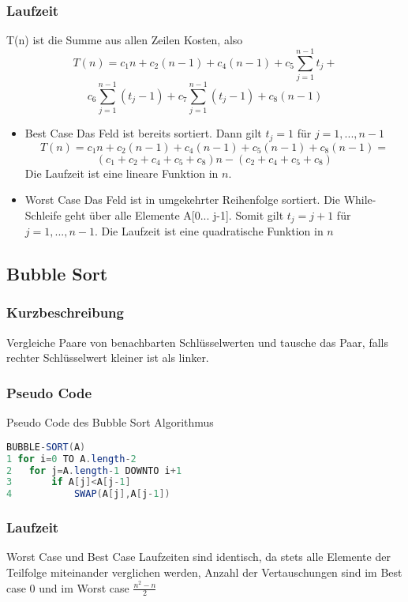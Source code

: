 \documentclass[jou,apacite]{apa6}
\begin{document}
   
\subsubsection{Laufzeit} T(n) ist die Summe aus allen Zeilen Kosten, also 
    \[T(n)=c_{1}n+c_2(n-1)+c_4(n-1)+c_5\sum\limits_{j=1}^{n-1}t_j+\]\[c_6\sum\limits_{j=1}^{n-1}(t_j-1)+c_7\sum\limits_{j=1}^{n-1}(t_j-1)+c_8(n-1)\]
    
    
\begin{itemize}
    \item Best Case Das Feld ist bereits sortiert. Dann gilt $t_j=1$ für $j=1,...,n-1$  \[ T(n) = c_1n + c_2(n-1) + c_4(n-1) + c_5(n-1) + c_8(n-1) =\]\[ (c_1 + c_2 + c_4 + c_5 + c_8) n -(c_2 + c_4 + c_5 + c_8) \] Die Laufzeit ist eine lineare Funktion in $n$.
    \item Worst Case  Das Feld ist in umgekehrter Reihenfolge sortiert. Die While-Schleife geht über alle Elemente A[0... j-1]. Somit gilt $t_j = j+1$ für $j = 1,...,n-1$. Die Laufzeit ist eine quadratische Funktion in $n$
    \end{itemize}
    
\subsection{Bubble Sort}
\subsubsection{Kurzbeschreibung}

Vergleiche Paare von benachbarten Schlüsselwerten und tausche das Paar, falls rechter Schlüsselwert kleiner ist als linker.

\subsubsection{Pseudo Code}
Pseudo Code des Bubble Sort Algorithmus
\begin{lstlisting}[language=Java]
BUBBLE-SORT(A)
1 for i=0 TO A.length-2
2   for j=A.length-1 DOWNTO i+1
3       if A[j]<A[j-1]
4           SWAP(A[j],A[j-1])
\end{lstlisting}

\subsubsection{Laufzeit}
 Worst Case und Best Case Laufzeiten sind identisch, da stets alle Elemente der Teilfolge miteinander verglichen werden,
 Anzahl der Vertauschungen sind im Best case 0 und im Worst case $\frac{n^2-n}{2}$
\end{document}

